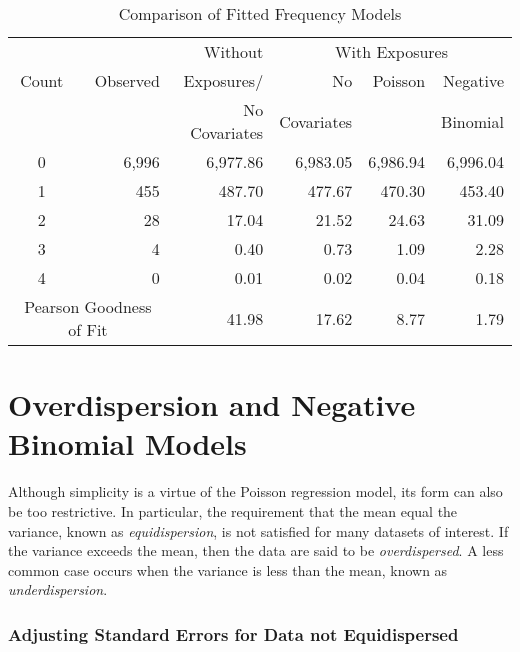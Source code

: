 {\begin{table}[h]\begin{center}
\caption{\label{T12:SingGoodFit} Comparison of Fitted Frequency
Models}
\begin{tabular}{crr|rrr}
\hline &  & Without & \multicolumn{3}{|c}{With Exposures} \\
\cline{4-6}
Count & Observed & Exposures/ & No & Poisson & Negative \\
&  & No Covariates & Covariates &  & Binomial \\ \hline
0 & 6,996 & 6,977.86 & 6,983.05 & 6,986.94 & 6,996.04 \\
1 & 455 & 487.70 & 477.67 & 470.30 & 453.40 \\
2 & 28 & 17.04 & 21.52 & 24.63 & 31.09 \\
3 & 4 & 0.40 & 0.73 & 1.09 & 2.28 \\
4 & 0 & 0.01 & 0.02 & 0.04 & 0.18 \\ \hline
\multicolumn{2}{c}{Pearson Goodness of Fit} & 41.98 & 17.62 & 8.77 &
1.79
\\ \hline
\end{tabular}\end{center}  
\end{table}

\section{Overdispersion and Negative Binomial
Models}\label{S12:NBSection}

Although simplicity is a virtue of the Poisson regression model, its form
can also be too restrictive. In particular, the requirement that the mean
equal the variance, known as \emph{equidispersion}, is not satisfied for
many datasets of interest. If the variance exceeds the mean, then the data
are said to be \emph{overdispersed}. A less common case occurs when the
variance is less than the mean, known as \emph{underdispersion}.

\subsubsection*{Adjusting Standard Errors for Data not Equidispersed}

}
